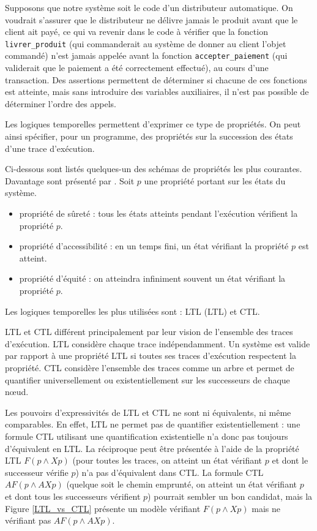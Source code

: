 Supposons que notre système soit le code d'un distributeur automatique.
On voudrait s'assurer que le distributeur ne délivre jamais le produit
avant que le client ait payé, ce qui va revenir dans le code à vérifier
que la fonction \texttt{livrer\_produit} (qui commanderait au système
de donner au client l'objet commandé) n'est jamais appelée avant la
fonction \texttt{accepter\_paiement} (qui validerait que le paiement a
été correctement effectué), au cours d'une transaction. Des assertions
permettent de déterminer si chacune de ces fonctions est atteinte, mais
sans introduire des variables auxiliaires, il n'est pas possible de
déterminer l'ordre des appels.

Les logiques temporelles permettent d'exprimer ce type de propriétés. On
peut ainsi spécifier, pour un programme, des propriétés sur la
succession des états d'une trace d'exécution.

Ci-dessous sont listés quelques-un des schémas de propriétés les plus
courantes. Davantage sont présenté par \citep{LTL_scheme}. Soit \(p\) une
propriété portant sur les états du système.

\begin{itemize}
\item
  propriété de sûreté : tous les états atteints pendant l'exécution
  vérifient la propriété \(p\).
\item
  propriété d'accessibilité : en un temps fini, un état vérifiant la
  propriété \(p\) est atteint.
\item
  propriété d'équité : on atteindra infiniment souvent un état vérifiant la
  propriété \(p\).
\end{itemize}

Les logiques temporelles les plus utilisées sont : \acl{LTL} (\ac{LTL})
et \ac{CTL}.

\ac{LTL} et \ac{CTL} différent principalement par leur vision de l'ensemble des
traces d'exécution. \ac{LTL} considère chaque trace indépendamment. Un
système est valide par rapport à une propriété \ac{LTL} si toutes ses traces
d'exécution respectent la propriété. \ac{CTL} considère l'ensemble des traces
comme un arbre et permet de quantifier universellement
ou existentiellement sur les successeurs de chaque nœud.

Les pouvoirs d'expressivités de \ac{LTL} et \ac{CTL} ne sont ni équivalents, ni même
comparables. En effet, \ac{LTL} ne permet pas de quantifier existentiellement :
une formule \ac{CTL} utilisant une quantification existentielle n'a donc pas
toujours d'équivalent en \ac{LTL}. La réciproque peut être présentée à l'aide de
la propriété \ac{LTL} \(F (p \land X p)\) (pour toutes les traces, on atteint un
état vérifiant \(p\) et dont le successeur vérifie \(p\)) n'a pas d'équivalent
dans \ac{CTL}. La formule \ac{CTL} \(AF (p \land AX p)\) (quelque soit le chemin
emprunté, on atteint un état vérifiant \(p\) et dont tous les successeurs
vérifient \(p\)) pourrait sembler un bon candidat, mais la Figure
\ref{LTL_vs_CTL} présente un modèle vérifiant \(F (p \land X p)\) mais ne
vérifiant pas \(AF (p \land AX p)\).

